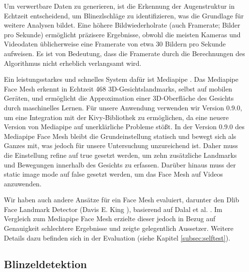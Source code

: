 Um verwertbare Daten zu generieren, ist die Erkennung der Augenstruktur in Echtzeit entscheidend, um Blinezlschläge zu identifizieren, was die Grundlage für weitere Analysen bildet. Eine höhere Bildwiederholrate (auch Framerate; Bilder pro Sekunde) ermöglicht präzisere Ergebnisse, obwohl die meisten Kameras und Videodaten üblicherweise eine Framerate von etwa 30 Bildern pro Sekunde aufweisen. Es ist von Bedeutung, dass die Framerate durch die Berechnungen des Algorithmus nicht erheblich verlangsamt wird. 

Ein leistungsstarkes und schnelles System dafür ist Mediapipe \cite{LU19}. Das Mediapipe Face Mesh erkennt in Echtzeit 468 3D-Gesichtslandmarks, selbst auf mobilen Geräten, und ermöglicht die Approximation einer 3D-Oberfläche des Gesichts durch maschinelles Lernen. Für unsere Anwendung verwenden wir Version 0.9.0, um eine Integration mit der Kivy-Bibliothek zu ermöglichen, da eine neuere Version von Mediapipe auf unerklärliche Probleme stößt. In der Version 0.9.0 des Mediapipe Face Mesh bleibt die Grundeinstellung statisch und bewegt sich als Ganzes mit, was jedoch für unsere Untersuchung unzureichend ist. Daher muss die Einstellung \glqq refine\grqq{} auf \glqq true\grqq{} gesetzt werden, um zehn zusätzliche Landmarks und Bewegungen innerhalb des Gesichts zu erfassen. Darüber hinaus muss der \glqq static image mode\grqq{} auf \glqq false\grqq{} gesetzt werden, um das Face Mesh auf Videos anzuwenden. 

Wir haben auch andere Ansätze für ein Face Mesh evaluiert, darunter den Dlib Face Landmark Detector (Davis E. King \cite{DLIB09}), basierend auf Dalal et al. \cite{DA05}. Im Vergleich zum Mediapipe Face Mesh erzielte dieser jedoch in Bezug auf Genauigkeit schlechtere Ergebnisse und zeigte gelegentlich Aussetzer. Weitere Details dazu befinden sich in der Evaluation (siehe Kapitel \ref{subsec:selftest}).

\subsection{Blinzeldetektion}
\label{sec:blinkdetection}

